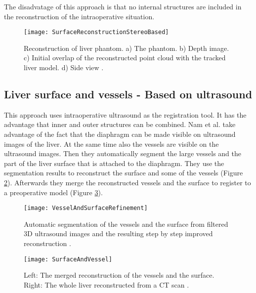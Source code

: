 The disadvatage of this approach is that no internal structures are included in
the reconstruction of the intraoperative situation.
\begin{figure}[H]
  \centering
 \texttt{[image: SurfaceReconstructionStereoBased]}
 \caption{Reconstruction of liver phantom. a) The phantom. b) Depth image. c)
   Initial overlap of the reconstructed point cloud with the tracked liver
   model. d) Side view \cite{speidel2011intraoperative}.}
  \label{fig:SurfaceReconstructionStereoBased}
\end{figure}

\subsection{Liver surface and vessels - Based on ultrasound}
This approach uses intraoperative ultrasound as the registration tool. It has
the advantage that inner and outer structures can be combined. Nam et al. \cite{nam2011automatic} take
advantage of the fact that the diaphragm can be made visible on ultrasound
images of the liver. At the same time also the vessels
are visible on the ultrasound images. Then they automatically segment the large
vessels and the part of the liver surface that is attached to the diaphragm.
They use the segmentation results to reconstruct the surface and some of the
vessels (Figure \ref{fig:VesselAndSurfaceRefinement}). Afterwards they merge the
reconstructed vessels and the surface to register to a preoperative model
(Figure \ref{fig:SurfaceAndVessel}).


\begin{figure}[H]
  \centering
 \texttt{[image: VesselAndSurfaceRefinement]}
 \caption{Automatic segmentation of the vessels and the surface from filtered 3D
   ultrasound images and the resulting step by step improved reconstruction \cite{nam2011automatic}.}
  \label{fig:VesselAndSurfaceRefinement}
\end{figure}

\begin{figure}[H]
  \centering
 \texttt{[image: SurfaceAndVessel]}
 \caption{Left: The merged reconstruction of the vessels and the surface. Right:
   The whole liver reconstructed from a CT scan \cite{nam2011automatic}.}
  \label{fig:SurfaceAndVessel}
\end{figure}

